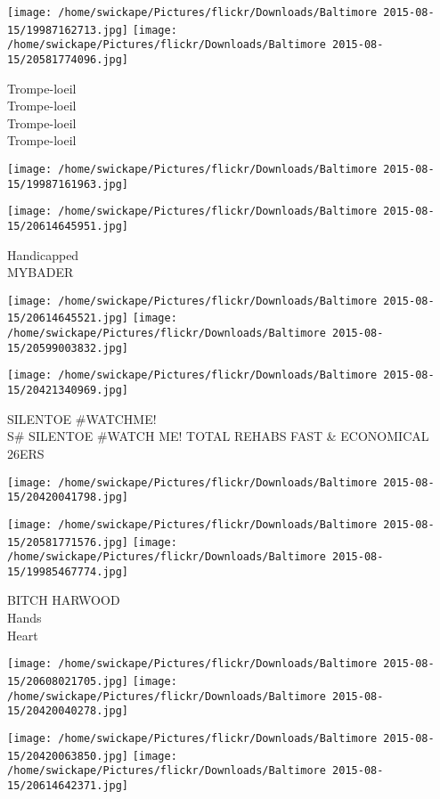 \documentclass[10pt,letterpaper]{article}
\begin{document}
\texttt{[image: /home/swickape/Pictures/flickr/Downloads/Baltimore 2015-08-15/19987162713.jpg]}
\texttt{[image: /home/swickape/Pictures/flickr/Downloads/Baltimore 2015-08-15/20581774096.jpg]}

Trompe{-}loeil\\
Trompe{-}loeil\\
Trompe{-}loeil\\
Trompe{-}loeil
\pagebreak

\texttt{[image: /home/swickape/Pictures/flickr/Downloads/Baltimore 2015-08-15/19987161963.jpg]}

\vspace{0.25in}
\texttt{[image: /home/swickape/Pictures/flickr/Downloads/Baltimore 2015-08-15/20614645951.jpg]}

Handicapped\\
MYBADER
\pagebreak

\texttt{[image: /home/swickape/Pictures/flickr/Downloads/Baltimore 2015-08-15/20614645521.jpg]}
\texttt{[image: /home/swickape/Pictures/flickr/Downloads/Baltimore 2015-08-15/20599003832.jpg]}

\texttt{[image: /home/swickape/Pictures/flickr/Downloads/Baltimore 2015-08-15/20421340969.jpg]}

SILENTOE \#WATCHME!\\
S\# SILENTOE \#WATCH ME! TOTAL REHABS FAST \& ECONOMICAL\\
26ERS
\pagebreak

\texttt{[image: /home/swickape/Pictures/flickr/Downloads/Baltimore 2015-08-15/20420041798.jpg]}

\vspace{0.25in}
\texttt{[image: /home/swickape/Pictures/flickr/Downloads/Baltimore 2015-08-15/20581771576.jpg]}
\texttt{[image: /home/swickape/Pictures/flickr/Downloads/Baltimore 2015-08-15/19985467774.jpg]}

BITCH HARWOOD\\
Hands\\
Heart
\pagebreak

\texttt{[image: /home/swickape/Pictures/flickr/Downloads/Baltimore 2015-08-15/20608021705.jpg]}
\texttt{[image: /home/swickape/Pictures/flickr/Downloads/Baltimore 2015-08-15/20420040278.jpg]}

\texttt{[image: /home/swickape/Pictures/flickr/Downloads/Baltimore 2015-08-15/20420063850.jpg]}
\texttt{[image: /home/swickape/Pictures/flickr/Downloads/Baltimore 2015-08-15/20614642371.jpg]}
\end{document}
